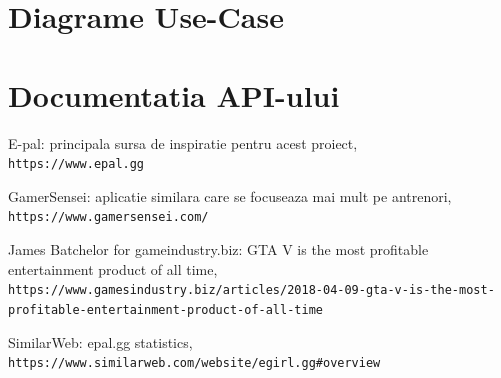 \documentclass{article}
\begin{document}
\section{Diagrame Use-Case}

\section{Documentatia API-ului}

\begin{thebibliography}{9}

E-pal: principala sursa de inspiratie pentru acest proiect,
\\\texttt{https://www.epal.gg}

GamerSensei: aplicatie similara care se focuseaza mai mult pe antrenori,
\\\texttt{https://www.gamersensei.com/}

James Batchelor for gameindustry.biz: GTA V is the most profitable entertainment product of all time,
\\\texttt{https://www.gamesindustry.biz/articles/2018-04-09-gta-v-is-the-most-profitable-entertainment-product-of-all-time}

SimilarWeb: epal.gg statistics,
\\\texttt{https://www.similarweb.com/website/egirl.gg\#overview}

\end{thebibliography}
\end{document}
